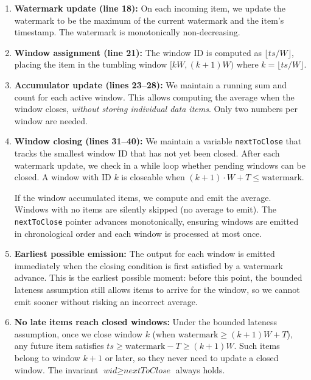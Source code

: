 \documentclass[11pt]{article}
\newcommand{\mnt}[1]{{\small\texttt{#1}}}
\theoremstyle{definition}
\newcommand{\ts}{\mathit{ts}}
\begin{document}
\begin{enumerate}
	\item \textbf{Watermark update (line 18):} On each incoming item, we update the watermark to be the maximum of the current watermark and the item's timestamp. The watermark is monotonically non-decreasing.

	\item \textbf{Window assignment (line 21):} The window ID is computed as $\lfloor \ts / W \rfloor$, placing the item in the tumbling window $[kW, (k+1)W)$ where $k = \lfloor \ts / W \rfloor$.

	\item \textbf{Accumulator update (lines 23--28):} We maintain a running sum and count for each active window. This allows computing the average when the window closes, \emph{without storing individual data items}. Only two numbers per window are needed.

	\item \textbf{Window closing (lines 31--40):} We maintain a variable \mnt{nextToClose} that tracks the smallest window ID that has not yet been closed. After each watermark update, we check in a while loop whether pending windows can be closed. A window with ID $k$ is closeable when $(k + 1) \cdot W + T \leq \text{watermark}$.

	      If the window accumulated items, we compute and emit the average. Windows with no items are silently skipped (no average to emit). The \mnt{nextToClose} pointer advances monotonically, ensuring windows are emitted in chronological order and each window is processed at most once.

	\item \textbf{Earliest possible emission:} The output for each window is emitted immediately when the closing condition is first satisfied by a watermark advance. This is the earliest possible moment: before this point, the bounded lateness assumption still allows items to arrive for the window, so we cannot emit sooner without risking an incorrect average.

	\item \textbf{No late items reach closed windows:} Under the bounded lateness assumption, once we close window $k$ (when $\text{watermark} \geq (k+1)W + T$), any future item satisfies $\ts \geq \text{watermark} - T \geq (k+1)W$. Such items belong to window $k+1$ or later, so they never need to update a closed window. The invariant $\textit{wid} \geq \textit{nextToClose}$ always holds.
\end{enumerate}
\end{document}
